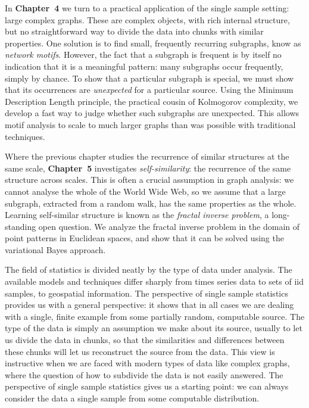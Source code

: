 \documentclass{thesis}
\theoremstyle{definition}
\begin{document}
In \textbf{Chapter~4} we turn to a practical application of the single sample setting: large complex graphs. These are complex objects, with rich internal structure, but no straightforward way to divide the data into chunks with similar properties. One solution is to find small, frequently recurring subgraphs, know as \emph{network motifs}. However, the fact that a subgraph is frequent is by itself no indication that it is a meaningful pattern: many subgraphs occur frequently, simply by chance. To show that a particular subgraph is special, we must show that its occurrences are \emph{unexpected} for a particular source. Using the Minimum Description Length principle, the practical cousin of Kolmogorov complexity, we develop a fast way to judge whether such subgraphs are unexpected. This allows motif analysis to scale to much larger graphs than was possible with traditional techniques.

Where the previous chapter studies the recurrence of similar structures at the same scale, \textbf{Chapter~5} investigates \emph{self-similarity}: the recurrence of the same structure across scales. This is often a crucial assumption in graph analysis: we cannot analyse the whole of the World Wide Web, so we assume that a large subgraph, extracted from a random walk, has the same properties as the whole. Learning self-similar structure is known as the \emph{fractal inverse problem}, a long-standing open question. We analyze the fractal inverse problem in the domain of point patterns in Euclidean spaces, and show that it can be solved using the variational Bayes approach. 

The field of statistics is divided neatly by the type of data under analysis. The available models and techniques differ sharply from times series data to sets of iid samples, to geospatial information. The perspective of single sample statistics provides us with a general perspective: it shows that in all cases we are dealing with a single, finite example from some partially random, computable source. The type of the data is simply an assumption we make about its source, usually to let us divide the data in chunks, so that the similarities and differences between these chunks will let us reconstruct the source from the data. This view is instructive when we are faced with modern types of data like complex graphs, where the question of how to subdivide the data is not easily answered. The perspective of single sample statistics gives us a starting point: we can always consider the data a single sample from some computable distribution.
\end{document}
